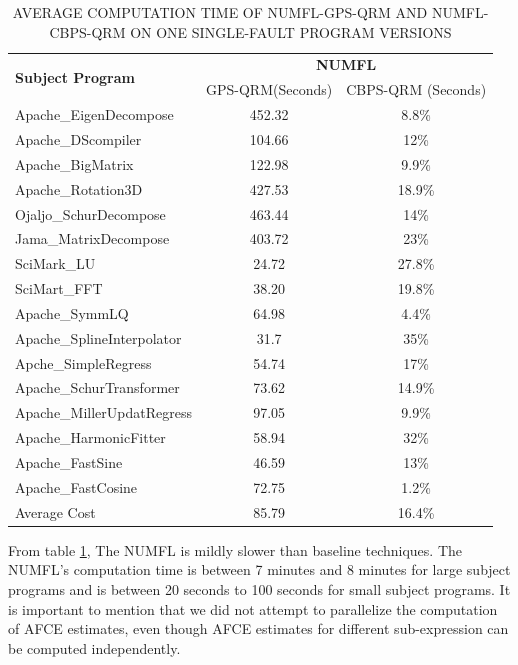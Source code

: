 \begin{table}[htbp!]
\caption{AVERAGE COMPUTATION TIME OF NUMFL-GPS-QRM AND NUMFL-CBPS-QRM ON ONE SINGLE-FAULT PROGRAM VERSIONS }
\label{computetime}
\centering
      \begin{tabular}{|l|c|c|}
      \hline
\multirow{2}{*}{{\bf Subject Program}}	&	\multicolumn{2}{|c|}{{\bf NUMFL}}	\\	\cline{2-3}
  &  GPS-QRM(Seconds) &CBPS-QRM (Seconds)\\ \hline
Apache\_EigenDecompose	&	452.32	&	8.8\%	\\	\hline
Apache\_DScompiler	&	104.66	&	12\%	\\	\hline
Apache\_BigMatrix	&	122.98	&	9.9\%	\\	\hline
Apache\_Rotation3D	&	427.53	&	18.9\%	\\	\hline
Ojaljo\_SchurDecompose	&	463.44	&	14\%	\\	\hline
Jama\_MatrixDecompose	&	403.72	&	23\%	\\	\hline
SciMark\_LU	&	24.72	&	27.8\%	\\	\hline
SciMart\_FFT	&	38.20	&	19.8\%	\\	\hline
Apache\_SymmLQ	&	64.98	&	4.4\%	\\	\hline
Apache\_SplineInterpolator	&	31.7	&	35\%	\\	\hline
Apche\_SimpleRegress	&	54.74	&	17\%	\\	\hline
Apache\_SchurTransformer	&	73.62	&	14.9\%	\\	\hline
Apache\_MillerUpdatRegress	&	97.05	&	9.9\%	\\	\hline
Apache\_HarmonicFitter	&	58.94	&	32\%	\\	\hline
Apache\_FastSine	&	46.59	&	13\%	\\	\hline
Apache\_FastCosine	&	72.75	&	1.2\%	\\	\hline
Average Cost	&	85.79	&	16.4\%	\\	\hline
\end{tabular}
\end{table}

From table \ref{computetime}, The NUMFL is mildly slower than baseline techniques. The NUMFL's computation time is between 7 minutes and 8 minutes for large subject programs and is between  20 seconds to 100 seconds for small subject programs. It is important to mention that we did not attempt to parallelize the computation of AFCE estimates, even though AFCE estimates for different sub-expression can be computed independently.

